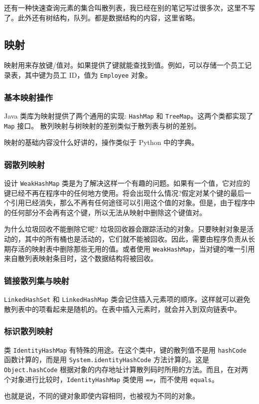 还有一种快速查询元素的集合叫散列表，我已经在别的笔记写过很多次，这里不写了。此外还有树结构，队列。都是数据结构的内容，这里省略。

\subsection{映射}

映射用来存放键/值对。如果提供了键就能查找到值。例如，可以存储一个员工记录表，其中键为员工 ID，值为 \texttt{Employee} 对象。

\subsubsection{基本映射操作}

Java 类库为映射提供了两个通用的实现: \texttt{HashMap} 和 \texttt{TreeMap}。这两个类都实现了 \texttt{Map} 接口。 散列映射与树映射的差别类似于散列表与树的差别。

映射的基础内容没什么好讲的，操作类似于 Python 中的字典。

\subsubsection{弱散列映射}

设计 \texttt{WeakHashMap} 类是为了解决这样一个有趣的问题。如果有一个值，它对应的键已经不再在程序中的任何地方使用。将会出现什么情况?假定对某个键的最后一个引用已经消失，那么不再有任何途径可以引用这个值的对象。但是，由于程序中的任何部分不会再有这个键，所以无法从映射中删除这个键值对。

为什么垃圾回收不能删除它呢? 垃圾回收器会跟踪活动的对象。只要映射对象是活动的，其中的所有桶也是活动的，它们就不能被回收。因此，需要由程序负责从长期存活的映射表中删除那些无用的值。或者使用 \texttt{WeakHashMap}，当对键的唯一引用来自散列表映射条目时，这个数据结构将被回收。

\subsubsection{链接散列集与映射}

\texttt{LinkedHashSet} 和 \texttt{LinkedHashMap} 类会记住插入元素项的顺序。这样就可以避免散列表中的项看起来是随机的。在表中插入元素时，就会并入到双向链表中。

\subsubsection{标识散列映射}

类 \texttt{IdentityHashMap} 有特殊的用途。在这个类中，键的散列值不是用 \texttt{hashCode} 函数计算的，而是用 \texttt{System.identityHashCode} 方法计算的。这是 \texttt{Object.hashCode} 根据对象的内存地址计算散列码时所用的方法。而且，在对两个对象进行比较时，\texttt{IdentityHashMap} 类使用 \texttt{==}，而不使用 \texttt{equals}。

也就是说，不同的键对象即使内容相同，也被视为不同的对象。 

\newpage